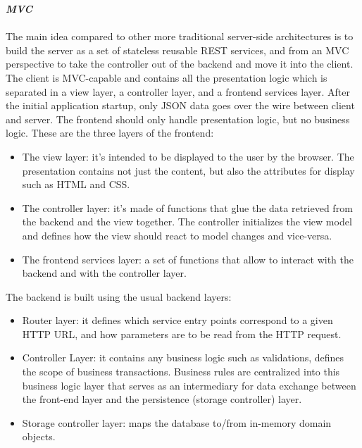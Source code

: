 \begin{legal}
\begin{legal}
				\item \textit{\textbf{MVC}}\\\\
				The main idea compared to other more traditional server-side architectures is to build the server as a set of stateless reusable REST services, and from an MVC perspective to take the controller out of the backend and move it into the client.
				The client is MVC-capable and contains all the presentation logic which is separated in a view layer, a controller layer, and a frontend services layer. After the initial application startup, only JSON data goes over the wire between client and server.
				The frontend should only handle presentation logic, but no business logic. These are the three layers of the frontend:
				\begin{itemize}
					\item The view layer: it's intended to be displayed to the user by the browser. The presentation contains not just the content, but also the attributes for display such as HTML and CSS.
					\item The controller layer: it's made of functions that glue the data retrieved from the backend and the view together. The controller initializes the view model and defines how the view should react to model changes and vice-versa.
					\item The frontend services layer: a set of functions that allow to interact with the backend and with the controller layer.
				\end{itemize}
				The backend is built using the usual backend layers:
				\begin{itemize}
    				\item Router layer: it defines which service entry points correspond to a given HTTP URL, and how parameters are to be read from the HTTP request.
					\item Controller Layer: it contains any business logic such as validations, defines the scope of business transactions. Business rules are centralized into this business logic layer that serves as an intermediary for data exchange between the front-end layer and the persistence (storage controller) layer.
    				\item Storage controller layer: maps the database to/from in-memory domain objects.
				\end{itemize}
				\begin{figure}

\end{figure}
\end{legal}
\end{legal}
